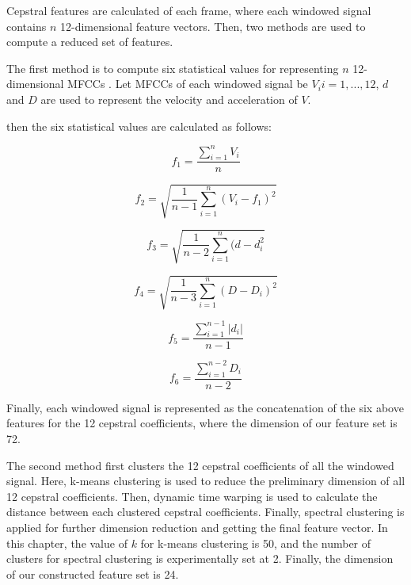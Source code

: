 Cepstral features are calculated of each frame, where each windowed signal contains $n$ 12-dimensional feature vectors. Then, two methods are used to compute a reduced set of features. 

The first method is to compute six statistical values for representing $n$ 12-dimensional MFCCs \citep{dufour2013clusterized}. Let MFCCs of each windowed signal be $V_{i}{i=1,...,12}$, $d$ and $D$ are used to represent the velocity and acceleration of $V$.


then the six statistical values are calculated as follows:

\begin{equation}
f_{1} = \frac{\sum_{i=1}^{n}V_{i}}{n}
\end{equation}

 
 \begin{equation}
 f_{2} = \sqrt{\frac{1}{n-1}\sum_{i=1}^{n}(V_{i}-f_{1})^{2}}
 \end{equation}


\begin{equation}
f_{3} = \sqrt{\frac{1}{n-2}\sum_{i=1}^{n}(d-d_{i}^{2}}
\end{equation}


\begin{equation}
f_{4} = \sqrt{\frac{1}{n-3}\sum_{i=1}^{n}(D-D_{i})^{2}}
\end{equation}



\begin{equation}
f_{5} = \frac{\sum_{i=1}^{n-1}|d_{i}|}{n-1}
\end{equation}


\begin{equation}
f_{6} = \frac{\sum_{i=1}^{n-2}D_{i}}{n-2}
\end{equation}


Finally, each windowed signal is represented as the concatenation of the six above features for the 12 cepstral coefficients, where the dimension of our feature set is 72.


The second method first clusters the 12 cepstral coefficients of all the windowed signal. Here, k-means clustering is used to reduce the preliminary dimension of all 12 cepstral coefficients. 
Then, dynamic time warping is used to calculate the distance between each clustered cepstral coefficients. Finally, spectral clustering is applied for further dimension reduction and getting the final feature vector. In this chapter, the value of $k$ for k-means clustering is 50, and the number of clusters for spectral clustering is experimentally set at 2. Finally, the dimension of our constructed feature set is 24.


